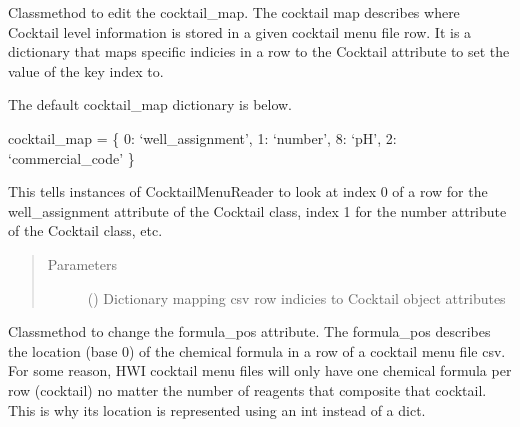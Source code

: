 \documentclass[letterpaper,10pt,english]{sphinxmanual}
\begin{document}
\begin{fulllineitems}
\begin{fulllineitems}
\begin{quote}
\begin{description}
\end{description}\end{quote}

\end{fulllineitems}


\begin{fulllineitems}
\label{\detokenize{polo.utils:polo.utils.io_utils.CocktailMenuReader.set_cocktail_map}}
Classmethod to edit the cocktail\_map. The cocktail map describes
where Cocktail level information is stored in a given cocktail menu
file row. It is a dictionary that maps specific indicies in a row to
the Cocktail attribute to set the value of the key index to.

The default cocktail\_map dictionary is below.

cocktail\_map = \{
0: ‘well\_assignment’,
1: ‘number’,
8: ‘pH’,
2: ‘commercial\_code’
\}

This tells instances of CocktailMenuReader to look at index 0 of a row
for the well\_assignment attribute of the Cocktail class, index 1 for
the number attribute of the Cocktail class, etc.
\begin{quote}\begin{description}
\item[{Parameters}] \leavevmode
{} () \textendash{} Dictionary mapping csv row indicies to Cocktail object
attributes

\end{description}\end{quote}

\end{fulllineitems}


\begin{fulllineitems}
\label{\detokenize{polo.utils:polo.utils.io_utils.CocktailMenuReader.set_formula_pos}}
Classmethod to change the formula\_pos attribute. The formula\_pos
describes the location (base 0) of the chemical formula in a row of
a cocktail menu file csv. For some reason, HWI cocktail menu files
will only have one chemical formula per row (cocktail) no matter
the number of reagents that composite that cocktail. This is why
its location is represented using an int instead of a dict.


\end{fulllineitems}
\end{fulllineitems}
\end{document}
